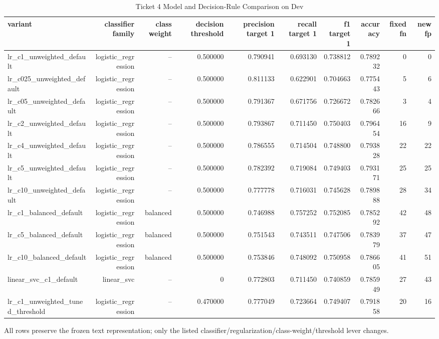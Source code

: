 \begin{table}[t]
\centering
\caption{Ticket 4 Model and Decision-Rule Comparison on Dev}
\label{tab:model_comparison}
\begin{adjustbox}{max width=\textwidth}
\scriptsize
\begin{tabular}{lrrrrrrrrr}
\hline
variant & classifier family & class weight & decision threshold & precision target 1 & recall target 1 & f1 target 1 & accuracy & fixed fn & new fp \\
\hline
lr\_c1\_unweighted\_default & logistic\_regression & -- & 0.500000 & 0.790941 & 0.693130 & 0.738812 & 0.789232 & 0 & 0 \\
lr\_c025\_unweighted\_default & logistic\_regression & -- & 0.500000 & 0.811133 & 0.622901 & 0.704663 & 0.775443 & 5 & 6 \\
lr\_c05\_unweighted\_default & logistic\_regression & -- & 0.500000 & 0.791367 & 0.671756 & 0.726672 & 0.782666 & 3 & 4 \\
lr\_c2\_unweighted\_default & logistic\_regression & -- & 0.500000 & 0.793867 & 0.711450 & 0.750403 & 0.796454 & 16 & 9 \\
lr\_c4\_unweighted\_default & logistic\_regression & -- & 0.500000 & 0.786555 & 0.714504 & 0.748800 & 0.793828 & 22 & 22 \\
lr\_c5\_unweighted\_default & logistic\_regression & -- & 0.500000 & 0.782392 & 0.719084 & 0.749403 & 0.793171 & 25 & 25 \\
lr\_c10\_unweighted\_default & logistic\_regression & -- & 0.500000 & 0.777778 & 0.716031 & 0.745628 & 0.789888 & 28 & 34 \\
lr\_c1\_balanced\_default & logistic\_regression & balanced & 0.500000 & 0.746988 & 0.757252 & 0.752085 & 0.785292 & 42 & 48 \\
lr\_c5\_balanced\_default & logistic\_regression & balanced & 0.500000 & 0.751543 & 0.743511 & 0.747506 & 0.783979 & 37 & 47 \\
lr\_c10\_balanced\_default & logistic\_regression & balanced & 0.500000 & 0.753846 & 0.748092 & 0.750958 & 0.786605 & 41 & 51 \\
linear\_svc\_c1\_default & linear\_svc & -- & 0 & 0.772803 & 0.711450 & 0.740859 & 0.785949 & 27 & 43 \\
lr\_c1\_unweighted\_tuned\_threshold & logistic\_regression & -- & 0.470000 & 0.777049 & 0.723664 & 0.749407 & 0.791858 & 20 & 16 \\
\hline
\end{tabular}
\end{adjustbox}
\par\footnotesize{All rows preserve the frozen text representation; only the listed classifier/regularization/class-weight/threshold lever changes.}
\end{table}
